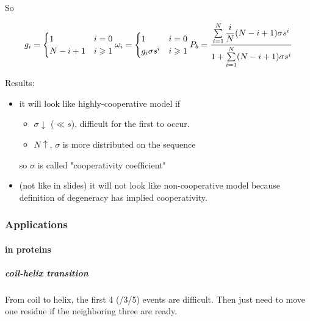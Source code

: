 \documentclass[]{article}
\let\oldparagraph\paragraph
\renewcommand{\paragraph}[1]{\oldparagraph{#1}\mbox{}}
\let\oldsubparagraph\subparagraph
\renewcommand{\subparagraph}[1]{\oldsubparagraph{#1}\mbox{}}
\begin{document}
So

\[g_i=
\begin{cases}
1 & i=0\\
N-i+1 & i\geqslant 1
\end{cases}\\

\omega_i=
\begin{cases}
1 & i=0\\
g_i\sigma s^i & i\geqslant 1
\end{cases}\\

P_b=\dfrac{\sum\limits_{i=1}^{N}\dfrac{i}{N}(N-i+1)\sigma s^i}{1+\sum\limits_{i=1}^{N}(N-i+1)\sigma s^i}\]

Results:

\begin{itemize}
\item
  it will look like highly-cooperative model if

  \begin{itemize}
  \item
    \(\sigma \downarrow\) (\(\ll s\)), difficult for the first to occur.
  \item
    \(N \uparrow\), \(\sigma\) is more distributed on the sequence
  \end{itemize}

  so \(\sigma\) is called "cooperativity coefficient"
\item
  (not like in slides) it will not look like non-cooperative model
  because definition of degeneracy has implied cooperativity.
\end{itemize}

\hypertarget{applications-2}{%
\subsubsection{Applications}\label{applications-2}}

\hypertarget{in-proteins}{%
\paragraph{in proteins}\label{in-proteins}}

\hypertarget{coil-helix-transition}{%
\subparagraph{coil-helix transition}\label{coil-helix-transition}}

From coil to helix, the first 4 (/3/5) events are difficult. Then just
need to move one residue if the neighboring three are ready.
\end{document}
